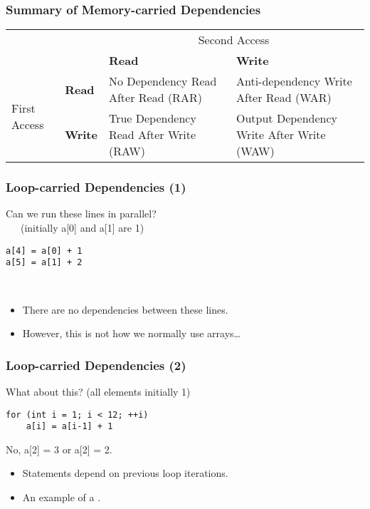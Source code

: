 \begin{frame}
\frametitle{Summary of Memory-carried Dependencies}
\begin{center}
\begin{tabular}{ll|p{2.8cm}p{3.2cm}}
& & \multicolumn{2}{c}{Second Access} \\ 
&  & \bf Read & \bf Write \\ \hline
\multirow{2}{*}{First Access} & \bf Read & No Dependency Read After Read (RAR)  & Anti-dependency Write After Read (WAR) \\[0.5em]
& \bf Write & True Dependency Read After Write (RAW) & Output Dependency Write After Write (WAW) \\
\end{tabular}
\end{center}
\end{frame}



\begin{frame}[fragile]
\frametitle{Loop-carried Dependencies (1)}

Can we run these lines in parallel? \\ ~~~(initially a[0] and a[1] are 1)
\begin{lstlisting}
a[4] = a[0] + 1
a[5] = a[1] + 2
\end{lstlisting}
\pause
{}\\[1em]
\begin{itemize}
\item There are no dependencies between these lines.
\item However, this is not how we normally use arrays\ldots
\end{itemize}

\end{frame}

\begin{frame}[fragile]
\frametitle{Loop-carried Dependencies (2)}

What about this? (all elements initially 1)
\begin{lstlisting}
for (int i = 1; i < 12; ++i)
    a[i] = a[i-1] + 1
\end{lstlisting}
\pause
\alert{No, a[2] = 3 or a[2] = 2.}\\[1em]
\begin{itemize}
\item Statements depend on previous loop iterations.
\item An example of a .
\end{itemize}

\end{frame}


